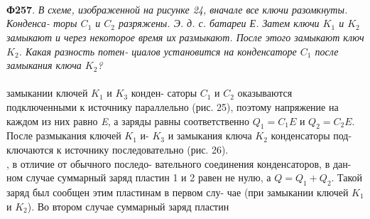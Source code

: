 \begin{minipage}[b]{0.44\textwidth}
	\\
	\\
	\\
	\textbf{Ф257}. \textit {В схеме, изображенной на рисунке 24,\linebreak
	вначале все ключи разомкнуты. Конденса-\linebreak
	торы $C_1$ и $C_2$ разряжены. Э. д. с. батареи\linebreak
	Е. Затем ключи $K_1$ и $K_2$ замыкают и через\linebreak
	некоторое время их размыкают. После этого\linebreak
	замыкают ключ $K_2$. Какая разность потен-\linebreak
	циалов установится на конденсаторе $C_1$\linebreak
	после замыкания ключа  $K_2$?}
	\\
	\\
	\null{} замыкании ключей $K_1$ и $K_3$ конден-\linebreak
	саторы $C_1$ и $C_2$ оказываются подключенными\linebreak
	к источнику параллельно (рис. 25), поэтому\linebreak
	напряжение на каждом из них равно \textit E, а\linebreak
	заряды равны соответственно $Q_1 = C_1E$ и\linebreak
	 $Q_2 = C_2E$. После размыкания ключей $K_1$ и-\linebreak
	 $K_3$ и замыкания ключа $K_2$ конденсаторы под-\linebreak
	 ключаются к источнику последовательно\linebreak
	 (рис. 26).\\
	 \null{}, в отличие от обычного последо-\linebreak
	 вательного соединения конденсаторов, в дан-\linebreak
	 ном случае суммарный заряд пластин 1 и 2 \linebreak
	 равен не нулю, а $Q = Q_1 + Q_2$. Такой заряд\linebreak
	 был сообщен этим пластинам в первом слу-\linebreak
	 чае (при замыкании ключей $K_1$ и $K_2$). Во\linebreak
	 втором случае суммарный заряд пластин
\end{minipage}
